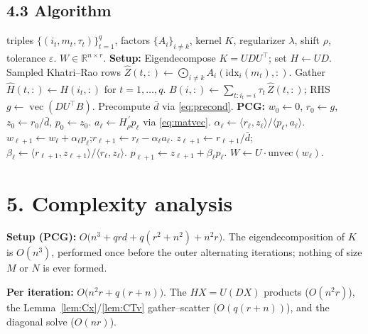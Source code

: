 \documentclass[11pt]{article}
\newcommand{\R}{\mathbb{R}}
\newcommand{\vecop}{\operatorname{vec}}
\newcommand{\bigKR}{\bigodot}      %
\newcommand{\bd}{\bar d}
\begin{document}
\subsection*{4.3 Algorithm}

\begin{algorithm}[H]
\caption{PCG for the transformed RKHS mode-$k$ subproblem}
\begin{algorithmic}[1]
\Require triples $\{(i_t,m_t,\tau_t)\}_{t=1}^q$, factors $\{A_i\}_{i\ne k}$,
         kernel $K$, regularizer $\lambda$, shift $\rho$, tolerance $\varepsilon$.
\Ensure $W\in\R^{n\times r}$.
\State \textbf{Setup:}
\State \quad Eigendecompose $K=UDU^{\!\top}$;\; set $H\gets UD$. 
\State \quad Sampled Khatri--Rao rows $\widehat Z(t,:)\gets\bigKR_{i\ne k}A_i(\mathrm{idx}_i(m_t),:)$. 
\State \quad Gather $\widehat H(t,:)\gets H(i_t,:)$ for $t=1,\dots,q$. 
\State \quad $B(i,:)\gets\sum_{t:i_t=i}\tau_t\,\widehat Z(t,:)$;\; RHS $g\gets\vecop(DU^{\!\top}B)$. 
\State \quad Precompute $\bd$ via \eqref{eq:precond}. 
\State \textbf{PCG:} $w_0\gets0$, $r_0\gets g$, $z_0\gets r_0/\bd$, $p_0\gets z_0$.
  \State $a_\ell\gets H_\rho^{\,\prime}p_\ell$ via \eqref{eq:matvec}. 
  \State $\alpha_\ell\gets\langle r_\ell,z_\ell\rangle/\langle p_\ell,a_\ell\rangle$.
  \State $w_{\ell+1}\gets w_\ell+\alpha_\ell p_\ell$;\quad $r_{\ell+1}\gets r_\ell-\alpha_\ell a_\ell$.
  \State $z_{\ell+1}\gets r_{\ell+1}/\bd$;\quad
         $\beta_\ell\gets\langle r_{\ell+1},z_{\ell+1}\rangle/\langle r_\ell,z_\ell\rangle$.
  \State $p_{\ell+1}\gets z_{\ell+1}+\beta_\ell p_\ell$.
\EndFor
\State \Return $W\gets U\cdot\mathrm{unvec}(w_\ell)$. 
\end{algorithmic}
\end{algorithm}

\section*{5. Complexity analysis}

\textbf{Setup (PCG):}
$O\bigl(n^3 + qrd + q(r^2+n^2) + n^2r\bigr)$. The eigendecomposition of $K$ is
$O(n^3)$, performed once before the outer alternating iterations; nothing of
size $M$ or $N$ is ever formed.

\textbf{Per iteration:} $O\bigl(n^2r + q(r+n)\bigr)$. The $HX=U(DX)$ products
($O(n^2r)$), the Lemma~\ref{lem:Cx}/\ref{lem:CTv} gather--scatter
($O(q(r+n))$), and the diagonal solve ($O(nr)$).
\end{document}
